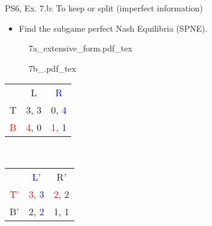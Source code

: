 \begin{frame}{PS6, Ex. 7.b: To keep or split (imperfect information)}
  \begin{itemize}
    \item[(b)] Find the subgame perfect Nash Equilibria (SPNE).
  \end{itemize}
  \vspace{-4pt}
  \begin{figure}[!h]
    \center
    \def\svgwidth{.8\columnwidth}
    {7a_extensive_form.pdf_tex}
  \end{figure}
  \vspace{-2pt}
  \begin{multicols}{2}
    \begin{figure}[!h]
      \center
      \def\svgwidth{.5\columnwidth}
      {7b_.pdf_tex}
    \end{figure}
    \vspace{-8pt}
    \begin{table}
      \begin{tabular}{l|c|c|}
        \multicolumn{1}{c}{} & \multicolumn{1}{c}{L} & \multicolumn{1}{c}{\textcolor{blue}{R}} \\\cline{2-3}
        T & 3, 3 & 0, \textcolor{blue}{4} \\\cline{2-3}
        \textcolor{red}{B} & \textcolor{red}{4}, 0 & \textcolor{red}{1}, \textcolor{blue}{1} \\\cline{2-3}
        \end{tabular}\
        \begin{tabular}{l|c|c|}
          \multicolumn{1}{c}{} & \multicolumn{1}{c}{\textcolor{blue}{L'}} & \multicolumn{1}{c}{R'} \\\cline{2-3}
          \textcolor{red}{T'} & \textcolor{red}{3}, \textcolor{blue}{3} & \textcolor{red}{2}, 2 \\\cline{2-3}
          B' & 2, \textcolor{blue}{2} & 1, 1 \\\cline{2-3}
        \end{tabular}
    \end{table}
  \vfill\null \columnbreak
  \vfill\null
  \end{multicols}
\end{frame}
